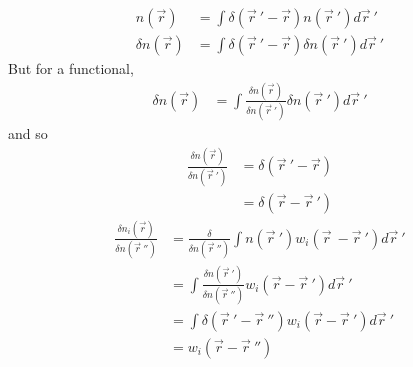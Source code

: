 \documentclass[double,12pt]{revtex4-2}
\begin{document}
\begin{align} 
  n(\vec r) &= \int \delta (\vec r~'-\vec r)n(\vec r~') d\vec r~'\\
  \delta n(\vec r) &= \int \delta (\vec r~'-\vec r)\delta n(\vec r~')
  d\vec r~'
\end{align} 
But for a functional,
\begin{align} 
\delta n(\vec r) &= \int \frac{\delta n(\vec r)}{\delta n(\vec r~')}
\delta n(\vec r~')d\vec r~'
\end{align} 
and so
\begin{align} 
  \frac{\delta n(\vec r)}{\delta n(\vec r~')} &= \delta (\vec r~'-\vec r) \\
                                               &= \delta (\vec r-\vec r~') 
\end{align} 
\begin{align} 
   \frac{\delta n_i(\vec r)}{\delta n(\vec r~'')}  &= \frac{\delta}
   {\delta n(\vec r~'')}\int n(\vec r~')w_i(\vec r~-\vec r~')d\vec r~'\\
   &= \int \frac{\delta n(\vec r~')}{\delta n(\vec r~'')}w_i(\vec r
   -\vec r~') d\vec r~' \\
   &= \int \delta (\vec r~' -\vec r~'')w_i(\vec r-\vec r~') d\vec r~'\\
   &= w_i(\vec r-\vec r~'') 
\end{align}
\end{document}
